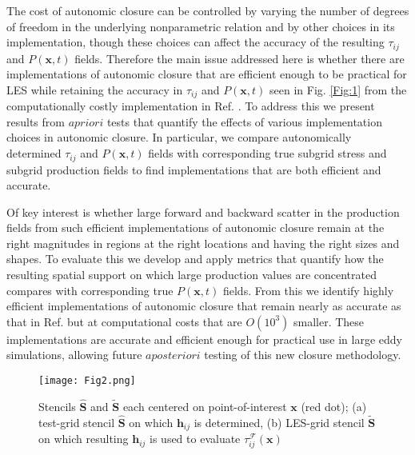 The cost of autonomic closure can be controlled by varying the number of degrees of freedom in the underlying nonparametric relation and by other choices in its implementation, though these choices can affect the accuracy of the resulting   $\tau_{ij}$   and   $P(\mathbf{x},t)$  fields. Therefore the main issue addressed here is whether there are implementations of autonomic closure that are efficient enough to be practical for LES while retaining the accuracy in   $\tau_{ij}$   and   $P(\mathbf{x},t)$   seen in Fig. \ref{Fig:1} from the computationally costly implementation in Ref. \cite{king2016autonomic}. To address this we present results from   $a priori$   tests that quantify the effects of various implementation choices in autonomic closure. In particular, we compare autonomically determined    $\tau_{ij}$   and   $P(\mathbf{x},t)$    fields with corresponding true subgrid stress and subgrid production fields to find implementations that are both efficient and accurate.  

Of key interest is whether large forward and backward scatter in the production fields from such efficient implementations of autonomic closure remain at the right magnitudes in regions at the right locations and having the right sizes and shapes. To evaluate this we develop and apply metrics that quantify how the resulting spatial support on which large production values are concentrated compares with corresponding true  $P(\mathbf{x},t)$  fields. From this we identify highly efficient implementations of autonomic closure that remain nearly as accurate as that in Ref. \cite{king2016autonomic} but at computational costs that are $O(10^3)$ smaller. These implementations are accurate and efficient enough for practical use in large eddy simulations, allowing future $a posteriori$ testing of this new closure methodology. 

%
\begin{figure}
	\begin{center}
	\texttt{[image: Fig2.png]}
	\caption{ Stencils $\mathbf{\widehat{S}}$ and $\mathbf{\widetilde{S}}$ each centered on point-of-interest $\mathbf{x}$ (red dot); (a) test-grid stencil $\mathbf{\widehat{S}}$ on which $\mathbf{h}_{ij}$ is determined, (b) LES-grid stencil $\mathbf{\widetilde{S}}$ on which resulting  $\mathbf{h}_{ij}$ is used to evaluate  $\tau_{ij}^{\mathcal{F}}(\mathbf{x})$  }
	\label{Fig:2}
	\end{center}
\end{figure}
%
%

